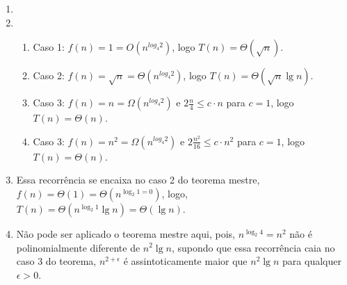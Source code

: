 \documentclass{article}
\begin{document}
\begin{enumerate}
	\item \begin{enumerate}
	\end{enumerate}

	\item \begin{enumerate}

		\item Caso 1: $f(n) = 1 = O(n^{log_4 2})$, logo $T(n) =
		\Theta(\sqrt{n})$.

		\item Caso 2: $f(n) = \sqrt{n} = \Theta(n^{log_4 2})$, logo $T(n) =
		\Theta(\sqrt{n}\lg n)$.

		\item Caso 3: $f(n) = n = \Omega(n^{log_4 2})$ e $2\frac{n}{4} \leq c
		\cdot n$ para $c=1$, logo $T(n) = \Theta(n)$.

		\item Caso 3: $f(n) = n^2 = \Omega(n^{log_4 2})$ e $2\frac{n^2}{16}
		\leq c \cdot n^2$ para $c=1$, logo $T(n) = \Theta(n)$.

	\end{enumerate}

	\item Essa recorrência se encaixa no caso 2 do teorema mestre, $f(n) =
	\Theta(1) = \Theta(n^{\log_2 1 = 0})$, logo, $T(n) = \Theta(n^{\log_2 1}
	\lg n) = \Theta(\lg n)$.

	\item Não pode ser aplicado o teorema mestre aqui, pois, $n^{\log_2 4} =
	n^2$ não é polinomialmente diferente de $n^2 \lg n$, supondo que essa
	recorrência caia no caso 3 do teorema, $n^{2+\epsilon}$ é assintoticamente
	maior que $n^2 \lg n$ para qualquer $\epsilon > 0$.

\end{enumerate}
\end{document}
